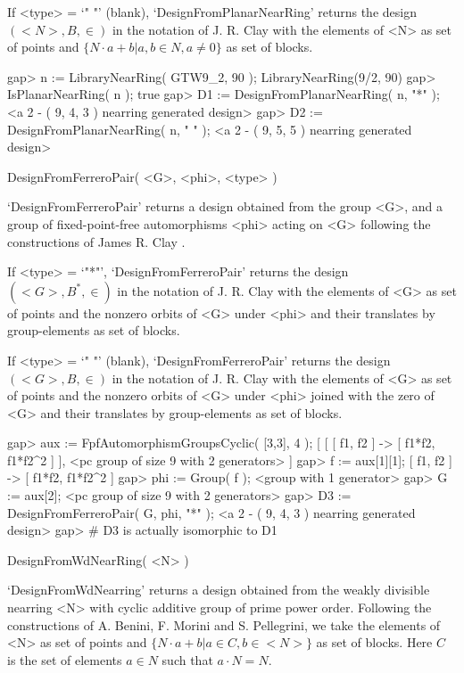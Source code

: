 If <type> = `" "' (blank), `DesignFromPlanarNearRing' returns the design 
$(<N>,B,\in)$ in the notation of J. R. Clay with the elements of <N> as 
set of points and $\{N\cdot a+b | a,b\in N, a \not= 0 \}$ as set of 
blocks.

\beginexample
    gap> n := LibraryNearRing( GTW9_2, 90 );
    LibraryNearRing(9/2, 90)
    gap> IsPlanarNearRing( n );
    true
    gap> D1 := DesignFromPlanarNearRing( n, "*" );
    <a 2 - ( 9, 4, 3 ) nearring generated design>
    gap> D2 := DesignFromPlanarNearRing( n, " " );
    <a 2 - ( 9, 5, 5 ) nearring generated design>
\endexample

\>DesignFromFerreroPair( <G>, <phi>, <type> )

`DesignFromFerreroPair' returns a design obtained from the group <G>, and
a group of fixed-point-free automorphisms <phi> acting on <G> following the
constructions of James R. Clay \cite{Clay:Nearrings}.

If <type> = `"*"', `DesignFromFerreroPair' returns the design 
$(<G>,B^{*},\in)$ in the notation of J. R. Clay with the elements of <G> as 
set of points and the nonzero orbits of <G> under <phi> and their 
translates by group-elements as set of blocks.

If <type> = `" "' (blank), `DesignFromFerreroPair' returns the design 
$(<G>,B,\in)$ in the notation of J. R. Clay with the elements of <G> as 
set of points and the nonzero orbits of <G> under <phi> joined with the zero
of <G> and their translates by group-elements as set of blocks.

\beginexample
    gap> aux := FpfAutomorphismGroupsCyclic( [3,3], 4 );
    [ [ [ f1, f2 ] -> [ f1*f2, f1*f2^2 ] ], 
      <pc group of size 9 with 2 generators> ]
    gap> f := aux[1][1];
    [ f1, f2 ] -> [ f1*f2, f1*f2^2 ]
    gap> phi := Group( f );
    <group with 1 generator>
    gap> G := aux[2]; 
    <pc group of size 9 with 2 generators>
    gap> D3 := DesignFromFerreroPair( G, phi, "*" );
    <a 2 - ( 9, 4, 3 ) nearring generated design>
    gap> # D3 is actually isomorphic to D1
\endexample

\>DesignFromWdNearRing( <N> )

`DesignFromWdNearring' returns a design obtained from the weakly divisible 
nearring <N> with cyclic additive group of prime power order. Following the
constructions of A. Benini, F. Morini and S. Pellegrini, we take the elements
of <N> as set of points and $\{N\cdot a+b | a\in C, b\in <N>\}$ as set of
blocks. Here $C$ is the set of elements $a\in N$ such that $a\cdot N = N$.

